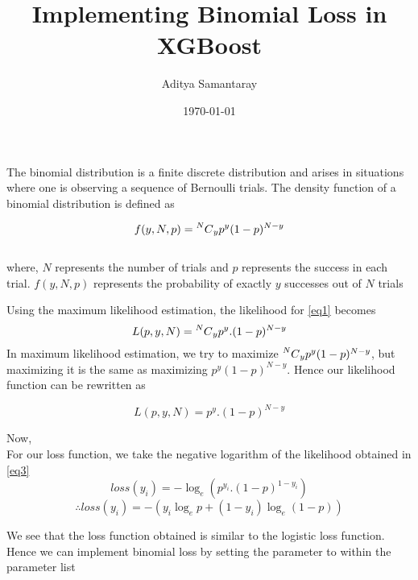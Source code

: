 \documentclass[12pt]{extarticle}
\title{Implementing Binomial Loss in XGBoost}
\author{Aditya Samantaray}
\date{\today}
\newcommand{\<}{\langle}
\renewcommand{\>}{\rangle}
\theoremstyle{definition}
\newcommand\comb[2][^n]{\prescript{#1\mkern-0.5mu}{}C_{#2}}
\begin{document}
\maketitle
\raggedright
The binomial distribution is a finite discrete distribution and arises in situations
where one is observing a sequence of Bernoulli trials. The density function of a binomial distribution is defined as

\begin{equation} 
f(y,N,p) = \comb[N]{y}p^y(1-p)^{N-y}
\label{eq1}\end{equation}
\\where, $N$ represents the number of trials and $p$ represents the success in each trial. $f(y,N,p)$ represents the probability of exactly $y$ successes out of $N$ trials
\newline
\newline

Using the maximum likelihood estimation, the likelihood for \eqref{eq1} becomes
\begin{equation} 
L(p,y,N) = \comb[N]{y}p^y.(1-p)^{N-y}
\label{eq2}\end{equation}
In maximum likelihood estimation, we try to maximize $\comb[N]{y}p^y(1-p)^{N-y}$, but maximizing it is the same as maximizing $p^y(1-p)^{N-y}$. Hence our likelihood function can be rewritten as

\begin{equation} 
L(p,y,N) = p^y.(1-p)^{N-y}
\label{eq3}\end{equation}



Now,\\
For our loss function, we take the negative logarithm of the likelihood obtained in \eqref{eq3}
\begin{equation} 
loss(y_i) = -\log_{e}(p^{y_i}.(1-p)^{1-y_i})
\label{eq:5}\end{equation}
\begin{equation} 
\therefore loss(y_i) = -(y_i\log_{e}p + (1-y_i)\log_{e}(1-p))
\label{eq:6}\end{equation}

We see that the loss function obtained is similar to the logistic loss function. Hence we can implement binomial loss by setting the  parameter to  within the parameter list
\end{document}
